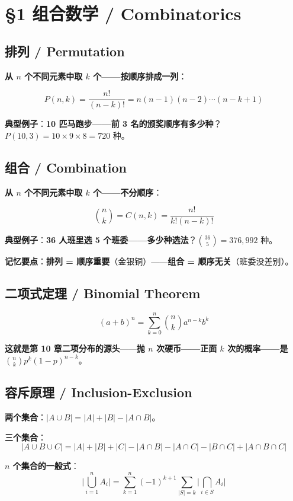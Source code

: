 \section{§1 组合数学 / Combinatorics}

\subsection{排列 / Permutation}

\textbf{从 $n$ 个不同元素中取 $k$ 个——\textbf{按顺序}排成一列}：

\[
P(n,k) = \frac{n!}{(n-k)!} = n(n-1)(n-2)\cdots(n-k+1)
\]

\textbf{典型例子}：\textbf{10 匹马跑步——前 3 名的颁奖顺序有多少种}？$P(10,3) = 10 \times 9 \times 8 = 720$ 种。

\subsection{组合 / Combination}

\textbf{从 $n$ 个不同元素中取 $k$ 个——\textbf{不分顺序}}：

\[
\binom{n}{k} = C(n,k) = \frac{n!}{k!(n-k)!}
\]

\textbf{典型例子}：\textbf{36 人班里选 5 个班委——多少种选法}？$\binom{36}{5} = 376{,}992$ 种。

\textbf{记忆要点}：\textbf{排列 = 顺序重要}（金银铜）——\textbf{组合 = 顺序无关}（班委没差别）。

\subsection{二项式定理 / Binomial Theorem}

\[
(a+b)^n = \sum_{k=0}^{n} \binom{n}{k} a^{n-k} b^k
\]

\textbf{这就是\textbf{第 10 章二项分布}的源头}——\textbf{抛 $n$ 次硬币——\textbf{正面 $k$ 次的概率}——是 $\binom{n}{k} p^k (1-p)^{n-k}$}。

\subsection{容斥原理 / Inclusion-Exclusion}

\textbf{两个集合}：$|A \cup B| = |A| + |B| - |A \cap B|$。

\textbf{三个集合}：
\[
|A \cup B \cup C| = |A| + |B| + |C| - |A \cap B| - |A \cap C| - |B \cap C| + |A \cap B \cap C|
\]

\textbf{$n$ 个集合的一般式}：
\[
\Big|\bigcup_{i=1}^{n} A_i\Big| = \sum_{k=1}^{n} (-1)^{k+1} \sum_{|S|=k} \Big|\bigcap_{i \in S} A_i\Big|
\]

